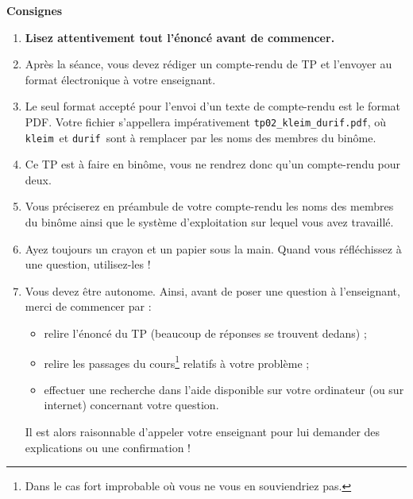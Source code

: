 \vspace{0.5cm}
\begin{Large}
{
\color{ocre}
\textbf{Consignes}
}
\end{Large}
\vspace{0.5cm}

\begin{enumerate}
\item  \textbf{Lisez attentivement  tout l'énoncé
    avant de commencer.}
\item Après la séance, vous devez rédiger un compte-rendu de TP et
l'envoyer au format électronique à votre enseignant.
\item Le seul format accepté pour l'envoi d'un texte de compte-rendu est le
format PDF. Votre fichier s'appellera impérativement \texttt{tp02\_kleim\_durif.pdf}, où \og \texttt{kleim}\fg\ et \og \texttt{durif}\fg\ sont à remplacer par les noms des membres du binôme. 
\item Ce TP est à faire en binôme, vous ne rendrez donc qu'un compte-rendu pour deux.
\item Vous préciserez en préambule de votre compte-rendu les noms des membres du binôme ainsi que le système d'exploitation sur lequel vous avez travaillé. 
\item Ayez toujours un crayon et un papier sous la main. Quand vous réfléchissez à une question, utilisez-les !
\item Vous devez être autonome. Ainsi, avant de poser une question à l'enseignant, merci de commencer par :
\begin{itemize}
  \item relire l'énoncé du TP (beaucoup de réponses se trouvent dedans) ;
  \item relire les passages du cours\footnote{Dans le cas fort 
improbable où vous ne vous en souviendriez pas.} relatifs à votre problème ;
  \item effectuer une recherche dans l'aide disponible sur votre ordinateur (ou sur internet) concernant votre question.
\end{itemize}
  Il est alors raisonnable d'appeler votre enseignant pour lui demander des explications ou une confirmation !
\end{enumerate}
